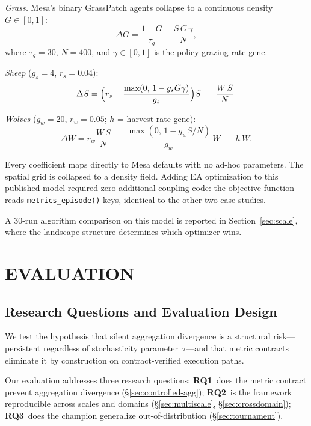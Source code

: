 \documentclass{wscpaperproc}
\begin{document}
\textit{Grass.} Mesa's binary GrassPatch agents collapse to a continuous
density $G\in[0,1]$:
\begin{equation}
  \Delta G = \frac{1-G}{\tau_g} - \frac{S\,G\,\gamma}{N},
  \label{eq:grass}
\end{equation}
where $\tau_g\!=\!30$, $N\!=\!400$, and $\gamma\!\in\![0,1]$ is the policy
grazing-rate gene.

\textit{Sheep} ($g_s\!=\!4$, $r_s\!=\!0.04$):
\begin{equation}
  \Delta S = \Bigl(r_s - \frac{\max(0,\,1-g_s G\gamma)}{g_s}\Bigr)S
             \;-\; \frac{W\,S}{N}.
  \label{eq:sheep}
\end{equation}

\textit{Wolves} ($g_w\!=\!20$, $r_w\!=\!0.05$; $h$ = harvest-rate gene):
\begin{equation}
  \Delta W = r_w \frac{W\,S}{N}
             \;-\; \frac{\max(0,\,1-g_w S/N)}{g_w}\,W
             \;-\; h\,W.
  \label{eq:wolf}
\end{equation}

Every coefficient maps directly to Mesa defaults with no ad-hoc parameters. The
spatial grid is collapsed to a density field. Adding EA optimization to this
published model required zero additional coupling code: the objective function
reads \texttt{metrics\_episode()} keys, identical to the other two case studies.

A 30-run algorithm comparison on this model is reported in Section~\ref{sec:scale},
where the landscape structure determines which optimizer wins.

\section{EVALUATION}

\subsection{Research Questions and Evaluation Design}

We test the hypothesis that silent aggregation divergence is a structural
risk---persistent regardless of stochasticity parameter~$\tau$---and that metric
contracts eliminate it by construction on contract-verified execution paths.

Our evaluation addresses three research questions:
\textbf{RQ1}~does the metric contract prevent aggregation divergence
(\S\ref{sec:controlled-agg});
\textbf{RQ2}~is the framework reproducible across scales and domains
(\S\ref{sec:multiscale}, \S\ref{sec:crossdomain});
\textbf{RQ3}~does the champion generalize out-of-distribution
(\S\ref{sec:tournament}).
\end{document}
